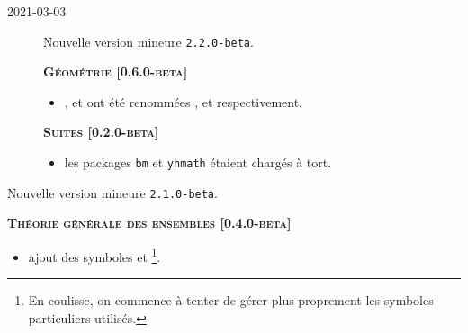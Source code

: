 \documentclass[12pt,a4paper]{book}
\begin{document}
        \begin{description}
\medskip
\item[2021-03-03] Nouvelle version mineure \verb+2.2.0-beta+.




\begin{center}
    \textbf{\textsc{Géométrie [0.6.0-beta]}}
\end{center}

\begin{itemize}[itemsep=.5em]
    \item {}
          ,
          et
          ont été renommées
          ,
          et
          respectivement.


\end{itemize}


\separation




\begin{center}
    \textbf{\textsc{Suites [0.2.0-beta]}}
\end{center}

\begin{itemize}[itemsep=.5em]
    \item {}
          les packages \verb#bm# et \verb#yhmath# étaient chargés à tort.   
\end{itemize}


\separation

\end{description}\begin{description}
\medskip
\item[2021-03-02] Nouvelle version mineure \verb+2.1.0-beta+.




\begin{center}
    \textbf{\textsc{Théorie générale des ensembles [0.4.0-beta]}}
\end{center}

\begin{itemize}[itemsep=.5em]
    \item {}
          ajout des symboles  et  
          \footnote{
          	En coulisse, on commence à tenter de gérer plus proprement les symboles particuliers utilisés.
		  }.
\end{itemize}



\end{description}
\end{document}
